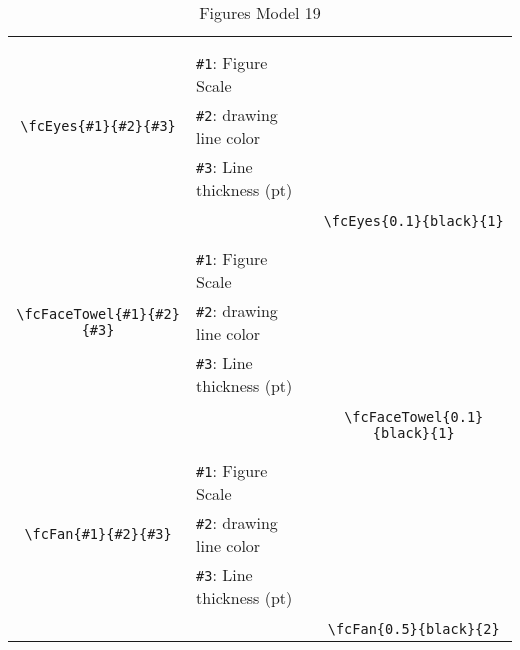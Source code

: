 \documentclass[x11names]{article}
\begin{document}
\begin{table}[H]
\begin{tabular}{|c|l|c|}
	&&\multirow{5}{*}{\fcEyes{0.1}{black}{1}}\\	&&\\	&\verb|#1|: Figure Scale &\\	\verb|\fcEyes{#1}{#2}{#3}|&	\verb|#2|: drawing line color &\\	&\verb|#3|: Line thickness (pt) &\\ &&\\&&	\verb|\fcEyes{0.1}{black}{1}|\\\hline 	
	&&\multirow{5}{*}{\fcFaceTowel{0.1}{black}{1}}\\	&&\\	&\verb|#1|: Figure Scale &\\	\verb|\fcFaceTowel{#1}{#2}{#3}|&	\verb|#2|: drawing line color &\\	&\verb|#3|: Line thickness (pt) &\\ &&\\&&	\verb|\fcFaceTowel{0.1}{black}{1}|\\\hline 	
	&&\multirow{5}{*}{\fcFan{0.5}{black}{2}}\\	&&\\	&\verb|#1|: Figure Scale &\\	\verb|\fcFan{#1}{#2}{#3}|&	\verb|#2|: drawing line color &\\	&\verb|#3|: Line thickness (pt) &\\ &&\\&&	\verb|\fcFan{0.5}{black}{2}|\\\hline 	\hline\end{tabular}\caption{Figures Model 19}\label{tab19}\end{table}
\end{document}
